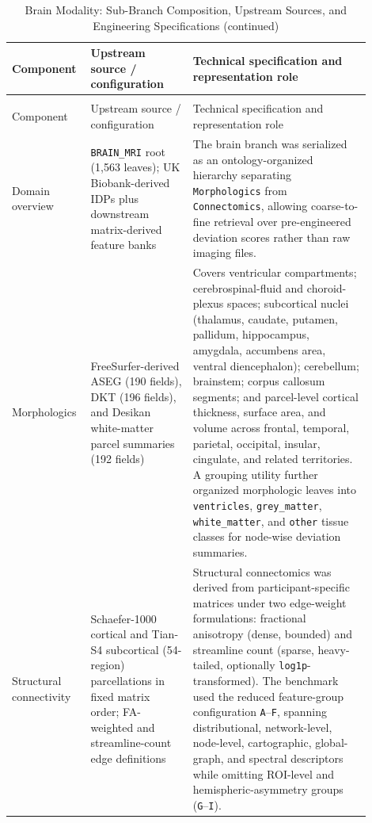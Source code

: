 \documentclass[11pt,a4paper,twoside]{article}
\renewcommand{\arraystretch}{1.2}
\begin{document}
\begingroup
\footnotesize
\setlength{\LTleft}{0pt}
\setlength{\LTright}{0pt}
\setlength{\tabcolsep}{4pt}
\renewcommand{\arraystretch}{1.1}
\begin{longtable}{p{0.16\linewidth} p{0.27\linewidth} p{0.47\linewidth}}
\caption{Brain Modality: Sub-Branch Composition, Upstream Sources, and Engineering Specifications}
\label{tab:s11}\\
\toprule
Component & Upstream source / configuration & Technical specification and representation role \\
\midrule
\endfirsthead
\caption[]{Brain Modality: Sub-Branch Composition, Upstream Sources, and Engineering Specifications (continued)}\\
\toprule
Component & Upstream source / configuration & Technical specification and representation role \\
\midrule
\endhead
\bottomrule
\endfoot
\bottomrule
\endlastfoot
Domain overview & \texttt{BRAIN\_MRI} root (1,563 leaves); UK Biobank-derived IDPs plus downstream matrix-derived feature banks & The brain branch was serialized as an ontology-organized hierarchy separating \texttt{Morphologics} from \texttt{Connectomics}, allowing coarse-to-fine retrieval over pre-engineered deviation scores rather than raw imaging files. \\
Morphologics & FreeSurfer-derived ASEG (190 fields), DKT (196 fields), and Desikan white-matter parcel summaries (192 fields) & Covers ventricular compartments; cerebrospinal-fluid and choroid-plexus spaces; subcortical nuclei (thalamus, caudate, putamen, pallidum, hippocampus, amygdala, accumbens area, ventral diencephalon); cerebellum; brainstem; corpus callosum segments; and parcel-level cortical thickness, surface area, and volume across frontal, temporal, parietal, occipital, insular, cingulate, and related territories. A grouping utility further organized morphologic leaves into \texttt{ventricles}, \texttt{grey\_matter}, \texttt{white\_matter}, and \texttt{other} tissue classes for node-wise deviation summaries. \\
Structural connectivity & Schaefer-1000 cortical and Tian-S4 subcortical (54-region) parcellations in fixed matrix order; FA-weighted and streamline-count edge definitions & Structural connectomics was derived from participant-specific matrices under two edge-weight formulations: fractional anisotropy (dense, bounded) and streamline count (sparse, heavy-tailed, optionally \texttt{log1p}-transformed). The benchmark used the reduced feature-group configuration \texttt{A}--\texttt{F}, spanning distributional, network-level, node-level, cartographic, global-graph, and spectral descriptors while omitting ROI-level and hemispheric-asymmetry groups (\texttt{G}--\texttt{I}). \\

\end{longtable}
\end{document}
